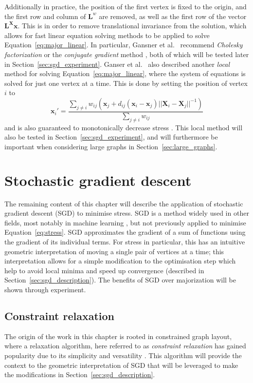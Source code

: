 Additionally in practice, the position of the first vertex is fixed to the origin, and the first row and column of $\mathbf{L}^w$ are removed, as well as the first row of the vector $\mathbf{L^Xx}$. This is in order to remove translational invariance from the solution, which allows for fast linear equation solving methods to be applied to solve Equation~\ref{eq:major_linear}.
In particular, Gansner et al.\ \cite{Gansner2004} recommend \emph{Cholesky factorization} \cite{Press2007Cholesky} or the \emph{conjugate gradient} method \cite{Press2007Conjugate}, both of which will be tested later in Section~\ref{sec:sgd_experiment}. 
Ganser et al.\ \cite{Gansner2004} also described another \emph{local} method for solving Equation~\ref{eq:major_linear}, where the system of equations is solved for just one vertex at a time. This is done by setting the position of vertex $i$ to
\begin{equation}
  \mathbf{x}_i' = \frac{\sum_{j\neq i}w_{ij}(\mathbf{x}_j + d_{ij}(\mathbf{x}_i - \mathbf{x}_j)||\mathbf{X}_i - \mathbf{X}_j||^{-1})}{\sum_{j\neq i}w_{ij}}
  \label{eq:major_local}
\end{equation}
and is also guaranteed to monotonically decrease stress \cite{Gansner2004}. This local method will also be tested in Section~\ref{sec:sgd_experiment}, and will furthermore be important when considering large graphs in Section~\ref{sec:large_graphs}.

\section{Stochastic gradient descent}
\label{sec:sgd}
The remaining content of this chapter will describe the application of stochastic gradient descent (SGD) to minimise stress. SGD is a method widely used in other fields, most notably in machine learning \cite{Bottou2012}, but not previously applied to minimise Equation~\ref{eq:stress}. 
SGD approximates the gradient of a sum of functions using the gradient of its individual terms. For stress in particular, this has an intuitive geometric interpretation of moving a single pair of vertices at a time; this interpretation allows for a simple modification to the optimisation step which help to avoid local minima and speed up convergence (described in Section~\ref{sec:sgd_description}). The benefits of SGD over majorization will be shown through experiment.

\subsection{Constraint relaxation}
\label{sec:wcr_story}
The origin of the work in this chapter is rooted in constrained graph layout, where a relaxation algorithm, here referred to as \emph{constraint relaxation} has gained popularity due to its simplicity and versatility \cite{Dwyer2009,Bostock2011}. This algorithm will provide the context to the geometric interpretation of SGD that will be leveraged to make the modifications in Section~\ref{sec:sgd_description}.


